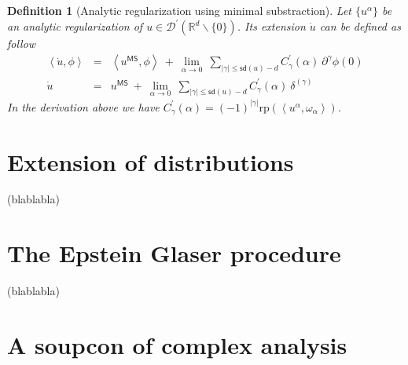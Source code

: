 \documentclass[10pt]{book}
\newcommand{\sd}{\mathsf{sd}}
\newcommand{\abs}[1]{\left|#1\right|}
\newcommand{\sm}[1]{\left\langle#1\right\rangle}
\newcommand{\Dcal}{\mathcal{D}}
\newcommand{\Rbb}{\mathbb{R}}
\theoremstyle{break}
\newtheorem{definition}{Definition}
\begin{document}
\begin{definition}[Analytic regularization using minimal substraction]
 Let $\{u^\alpha\}$ be an analytic regularization of $u \in \Dcal^\prime(\Rbb^d \backslash \{0\})$. Its extension $\dot{u}$ can be defined as follow
 \begin{eqnarray*}
  \sm{\dot{u},\phi} &=& \sm{u^{\mathsf{MS}},\phi} \ + \ \lim_{\alpha \to 0} \ \sum_{\abs{\gamma} \leq \sd(u) -d} C^{\prime}_{\gamma}(\alpha) \ \partial^\gamma \phi(0) \\
  \dot{u} &=& u^{\mathsf{MS}} \ + \ \lim_{\alpha \to 0} \ \sum_{\abs{\gamma} \leq \sd(u) -d} C^{\prime}_{\gamma}(\alpha) \ \delta^{(\gamma)} 
 \end{eqnarray*}
 In the derivation above we have $C^\prime_\gamma(\alpha) = (-1)^{\abs{\gamma}} \text{rp}\left(\sm{u^\alpha , \omega_\alpha}\right)$. 
\end{definition}








\section{Extension of distributions}



(blablabla)



\section{The Epstein Glaser procedure}



(blablabla)



\section{A soupcon of complex analysis}
\end{document}
